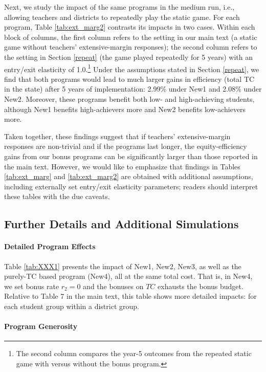 \documentclass[notitlepage,12pt]{article}%
\begin{document}
Next, we study the impact of the same programs in the medium run, i.e.,
allowing teachers and districts to repeatedly play the static game. For each
program, Table \ref{tab:ext_marg2} contrasts its impacts in two cases. Within
each block of columns, the first column refers to the setting in our main text
(a static game without teachers' extensive-margin responses); the second
column refers to the setting in Section \ref{repeat} (the game played
repeatedly for 5 years) with an entry/exit elasticity of 1.0.\footnote{The
second column compares the year-5 outcomes from the repeated static game with
versus without the bonus program.} Under the assumptions stated in Section
\ref{repeat}, we find that both programs would lead to much larger gains in
efficiency (total TC in the state) after 5 years of implementation: 2.99\%
under New1 and 2.08\% under New2. Moreover, these programs benefit both low-
and high-achieving students, although New1 benefits high-achievers more and
New2 benefits low-achievers more.

Taken together, these findings suggest that if teachers' extensive-margin
responses are non-trivial and if the programs last longer, the
equity-efficiency gains from our bonus programs can be significantly larger
than those reported in the main text. However, we would like to emphasize that
findings in Tables \ref{tab:ext_marg} and \ref{tab:ext_marg2} are obtained
with additional assumptions, including externally set entry/exit elasticity
parameters; readers should interpret these tables with the due caveats.

\subsection{Further Details and Additional Simulations}

\paragraph{Detailed Program Effects}

Table \ref{tab:XXX1} presents the impact of New1, New2, New3, as well as the
purely-TC based program (New4), all at the same total cost. That is, in New4,
we set bonus rate $r_{2}=0$ and the bonuses on $TC$ exhausts the bonus budget.
Relative to Table 7 in the main text, this table shows more detailed impacts:
for each student group within a district group.

\paragraph{Program Generosity}
\end{document}

